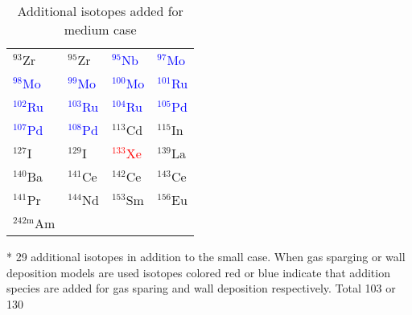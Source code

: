 \begin{table}[htbp]
    \caption{\label{tab:medium_nuclides} Additional isotopes added for medium case}
    \centering
    \begin{threeparttable}
    \begin{tabular}{C{3cm}C{3cm}C{3cm}C{3cm}}
    \hline
    ${}^{93}$Zr & ${}^{95}$Zr & \textcolor{blue}{${}^{95}$Nb} & \textcolor{blue}{${}^{97}$Mo} \\
    \textcolor{blue}{${}^{98}$Mo} & \textcolor{blue}{${}^{99}$Mo} & \textcolor{blue}{${}^{100}$Mo} & \textcolor{blue}{${}^{101}$Ru} \\
    \textcolor{blue}{${}^{102}$Ru} & \textcolor{blue}{${}^{103}$Ru} & \textcolor{blue}{${}^{104}$Ru} & \textcolor{blue}{${}^{105}$Pd} \\
    \textcolor{blue}{${}^{107}$Pd} & \textcolor{blue}{${}^{108}$Pd} & ${}^{113}$Cd & ${}^{115}$In \\
    ${}^{127}$I & ${}^{129}$I & \textcolor{red}{${}^{133}$Xe} & ${}^{139}$La \\
    ${}^{140}$Ba & ${}^{141}$Ce & ${}^{142}$Ce & ${}^{143}$Ce \\
    ${}^{141}$Pr & ${}^{144}$Nd & ${}^{153}$Sm & ${}^{156}$Eu \\
    ${}^{242\text{m}}$Am & & & \\
    \hline
    \end{tabular}
    \begin{tablenotes}\footnotesize
    \item[*] 29 additional isotopes in addition to the small case. When gas sparging or wall deposition models are used isotopes colored red or blue indicate that addition species are added for gas sparing and wall deposition respectively. Total 103 or 130
    
   \end{tablenotes}
   \end{threeparttable}
\end{table}

\clearpage

